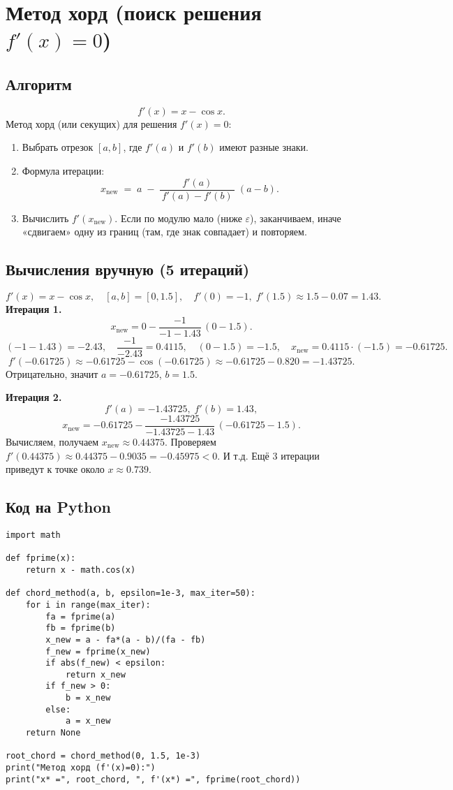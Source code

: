 \documentclass[12pt]{article}
\begin{document}
\section{Метод хорд (поиск решения $f'(x)=0$)}

\subsection{Алгоритм}
\[
f'(x)= x - \cos x.
\]
Метод хорд (или секущих) для решения $f'(x)=0$:
\begin{enumerate}
    \item Выбрать отрезок $[a,b]$, где $f'(a)$ и $f'(b)$ имеют разные знаки.
    \item Формула итерации:
    \[
      x_{\mathrm{new}} \;=\; a \;-\;
      \frac{f'(a)}{\,f'(a) - f'(b)\,}\;(a - b).
    \]
    \item Вычислить $f'(x_{\mathrm{new}})$. Если по модулю мало (ниже $\varepsilon$), заканчиваем, иначе «сдвигаем» одну из границ (там, где знак совпадает) и повторяем.
\end{enumerate}

\subsection{Вычисления вручную (5 итераций)}

\[
f'(x)=x-\cos x, \quad
[a,b]=[0,1.5],\quad f'(0)=-1,\; f'(1.5)\approx1.5-0.07=1.43.
\]
\textbf{Итерация 1.}
\[
x_{\mathrm{new}}
=0 - \frac{-1}{-1-1.43}\,(0-1.5).
\]
\[
(-1-1.43)=-2.43,\quad \frac{-1}{-2.43}=0.4115,\quad 
(0-1.5)=-1.5,
\quad
x_{\mathrm{new}}=0.4115\cdot(-1.5)=-0.61725.
\]
\[
f'(-0.61725)\approx -0.61725-\cos(-0.61725)\approx -0.61725-0.820=-1.43725.
\]
Отрицательно, значит $a=-0.61725$, $b=1.5$.

\textbf{Итерация 2.}
\[
f'(a)=-1.43725,\; f'(b)=1.43,
\]
\[
x_{\mathrm{new}}=-0.61725-\frac{-1.43725}{-1.43725-1.43}\,(-0.61725-1.5).
\]
Вычисляем, получаем $x_{\mathrm{new}}\approx0.44375$. Проверяем $f'(0.44375)\approx0.44375-0.9035=-0.45975<0$.  
И т.д. Ещё 3 итерации приведут к точке около $x\approx 0.739$.

\subsection{Код на Python}

\begin{verbatim}
import math

def fprime(x):
    return x - math.cos(x)

def chord_method(a, b, epsilon=1e-3, max_iter=50):
    for i in range(max_iter):
        fa = fprime(a)
        fb = fprime(b)
        x_new = a - fa*(a - b)/(fa - fb)
        f_new = fprime(x_new)
        if abs(f_new) < epsilon:
            return x_new
        if f_new > 0:
            b = x_new
        else:
            a = x_new
    return None

root_chord = chord_method(0, 1.5, 1e-3)
print("Метод хорд (f'(x)=0):")
print("x* =", root_chord, ", f'(x*) =", fprime(root_chord))
\end{verbatim}
\end{document}
